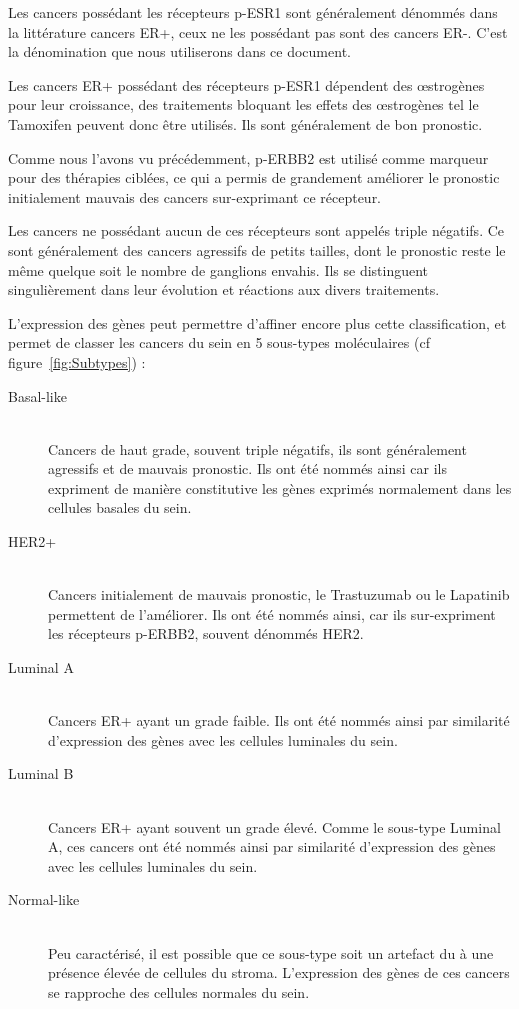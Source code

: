       Les cancers possédant les récepteurs \acs{p-ESR1} sont généralement dénommés dans la littérature cancers \acs{ER+}, ceux ne les possédant pas sont des cancers \acs{ER-}.
      C'est la dénomination que nous utiliserons dans ce document.

      Les cancers \acs{ER+} possédant des récepteurs \acs{p-ESR1} dépendent des {\oe}strogènes pour leur croissance, des traitements bloquant les effets des {\oe}strogènes tel le Tamoxifen peuvent donc être utilisés.
      Ils sont généralement de bon pronostic.

      Comme nous l'avons vu précédemment, \acs{p-ERBB2} est utilisé comme marqueur pour des thérapies ciblées, ce qui a permis de grandement améliorer le pronostic initialement mauvais des cancers sur-exprimant ce récepteur.

      Les cancers ne possédant aucun de ces récepteurs sont appelés triple négatifs.
      Ce sont généralement des cancers agressifs de petits tailles, dont le pronostic reste le même quelque soit le nombre de ganglions envahis.
      Ils se distinguent singulièrement dans leur évolution et réactions aux divers traitements.

      L'expression des gènes peut permettre d'affiner encore plus cette classification, et permet de classer les cancers du sein en 5 sous-types moléculaires (cf figure~\ref{fig:Subtypes}) :
      \begin{description}
      \item [Basal-like]  \hfill \\
        Cancers de haut grade, souvent triple négatifs, ils sont généralement agressifs et de mauvais pronostic.
        Ils ont été nommés ainsi car ils expriment de manière constitutive les gènes exprimés normalement dans les cellules basales du sein.
      \item [\acs{HER2+}] \hfill \\
        Cancers initialement de mauvais pronostic, le Trastuzumab ou le Lapatinib permettent de l'améliorer.
        Ils ont été nommés ainsi, car ils sur-expriment les récepteurs \acs{p-ERBB2}, souvent dénommés \acs{HER2}.
      \item [Luminal A]   \hfill \\
        Cancers \acs{ER+} ayant un grade faible.
        Ils ont été nommés ainsi par similarité d'expression des gènes avec les cellules luminales du sein.
      \item [Luminal B]   \hfill \\
        Cancers \acs{ER+} ayant souvent un grade élevé.
        Comme le sous-type Luminal A, ces cancers ont été nommés ainsi par similarité d'expression des gènes avec les cellules luminales du sein.
      \item [Normal-like] \hfill \\
        Peu caractérisé, il est possible que ce sous-type soit un artefact du à une présence élevée de cellules du stroma.
        L'expression des gènes de ces cancers se rapproche des cellules normales du sein.
      \end{description}

